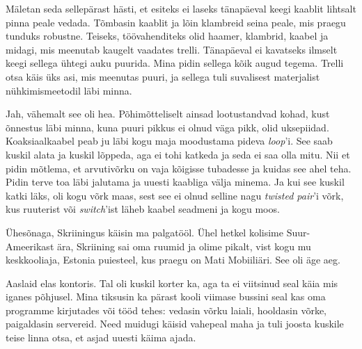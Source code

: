 Mäletan seda sellepärast hästi, et 
esiteks ei laseks tänapäeval keegi kaablit lihtsalt pinna 
peale vedada. Tõmbasin kaablit ja lõin klambreid seina peale, mis praegu
tunduks robustne. Teiseks, töövahenditeks olid haamer, klambrid, 
kaabel ja midagi, mis meenutab kaugelt vaadates trelli. Tänapäeval ei kavatseks ilmselt keegi sellega ühtegi auku puurida. Mina pidin sellega kõik augud 
tegema. Trelli otsa käis üks asi, mis meenutas puuri, ja sellega tuli 
suvalisest materjalist nühkimismeetodil läbi minna.


Jah, vähemalt see oli hea. Põhimõtteliselt ainsad lootustandvad kohad, kust 
õnnestus läbi minna, kuna puuri pikkus ei olnud väga pikk, olid 
uksepiidad. Koaksiaalkaabel peab ju läbi kogu maja 
moodustama pideva \emph{loop}'i. See saab kuskil alata ja 
kuskil lõppeda, aga ei tohi katkeda ja seda ei saa olla mitu. Nii et
pidin mõtlema, et arvutivõrku on vaja kõigisse tubadesse ja
kuidas see ahel teha. Pidin terve toa läbi jalutama ja uuesti kaabliga välja 
minema. Ja kui see kuskil katki läks, oli kogu võrk maas, 
sest see ei olnud selline nagu \emph{twisted pair}'i võrk, kus ruuterist 
või \emph{switch}'ist läheb kaabel seadmeni ja kogu moos. 

Ühesõnaga, Skriiningus käisin ma palgatööl. Ühel hetkel kolisime Suur-Ameerikast 
ära, Skriining sai oma ruumid ja olime pikalt, vist 
kogu mu keskkooliaja, Estonia puiesteel, kus 
praegu on Mati Mobiiliäri. See oli äge aeg. 

Aaslaid elas kontoris. Tal oli kuskil korter ka, aga 
ta ei viitsinud seal käia mis iganes põhjusel. Mina tiksusin ka pärast kooli viimase 
bussini seal kas oma programme kirjutades või tööd 
tehes: vedasin võrku laiali, 
hooldasin võrke, paigaldasin servereid. Need muidugi käisid vahepeal maha ja 
tuli joosta kuskile teise linna otsa, et asjad uuesti käima ajada. 


